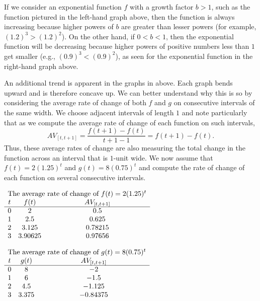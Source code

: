 \documentclass[nooutcomes]{ximera}
\begin{document}
If we consider an exponential function \(f\) with a growth factor \(b > 1\), such as the function pictured in the left-hand graph above, then the function is always increasing because higher powers of \(b\) are greater than lesser powers (for example, \((1.2)^3 \gt (1.2)^2\)).  On the other hand, if \(0 \lt b \lt 1\), then the exponential function will be decreasing because higher powers of positive numbers less than \(1\) get smaller (e.g., \((0.9)^3 \lt (0.9)^2\)), as seen for the exponential function in the right-hand graph above.

An additional trend is apparent in the graphs in above.  Each graph bends upward and is therefore concave up.  We can better understand why this is so by considering the average rate of change of both \(f\) and \(g\) on consecutive intervals of the same width.  We choose adjacent intervals of length \(1\) and note particularly that as we compute the average rate of change of each function on such intervals,%
\begin{equation*}
AV_{[t,t+1]} = \frac{f(t+1) - f(t)}{t+1-1} = f(t+1) - f(t)\text{.}
\end{equation*}
Thus, these average rates of change are also measuring the total change in the function across an interval that is \(1\)-unit wide. We now assume that \(f(t) = 2 (1.25)^t\) and \(g(t) = 8(0.75)^t\) and compute the rate of change of each function on several consecutive intervals.


\begin{center}
\(
{\begin{array}{ccc}
\multicolumn{3}{c}{\text{The average rate of change of } f(t) = 2(1.25)^t}\\
t&f(t)&AV_{[t,t+1]}\\
\hline
0&2&0.5\\
1&2.5&0.625\\
2&3.125&0.78215\\
3&3.90625&0.97656
\end{array}}%
\)
\end{center}
\begin{center}
\(
{\begin{array}{ccc}
\multicolumn{3}{c}{\text{The average rate of change of } g(t) = 8(0.75)^t}\\
t&g(t)&AV_{[t,t+1]}\\
\hline
0&8&-2\\
1&6&-1.5\\
2&4.5&-1.125\\
3&3.375&-0.84375
\end{array}}%
\)
\end{center}
\end{document}
